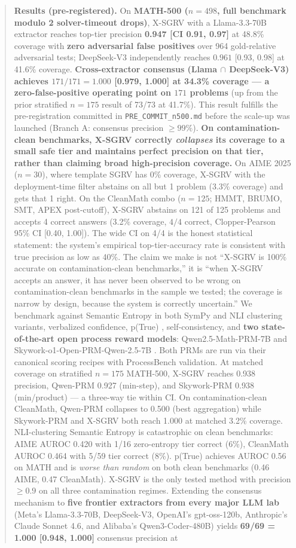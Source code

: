 \documentclass{article}
\begin{document}
\begin{abstract}
\textbf{Results (pre-registered).} On \textbf{MATH-500 ($n{=}498$, full benchmark modulo 2 solver-timeout drops)}, X-SGRV with a Llama-3.3-70B extractor reaches top-tier precision \textbf{0.947 [CI 0.91, 0.97]} at 48.8\% coverage with \textbf{zero adversarial false positives} over 964 gold-relative adversarial tests; DeepSeek-V3 independently reaches $0.961$ [0.93, 0.98] at 41.6\% coverage. \textbf{Cross-extractor consensus (Llama $\cap$ DeepSeek-V3) achieves $171/171 = 1.000$ [0.979, 1.000] at 34.3\% coverage --- a zero-false-positive operating point on $171$ problems} (up from the prior stratified $n{=}175$ result of 73/73 at 41.7\%). This result fulfills the pre-registration committed in \texttt{PRE\_COMMIT\_n500.md} before the scale-up was launched (Branch A: consensus precision $\ge 99\%$). \textbf{On contamination-clean benchmarks, X-SGRV correctly \emph{collapses} its coverage to a small safe tier and maintains perfect precision on that tier, rather than claiming broad high-precision coverage.} On AIME 2025 ($n{=}30$), where template SGRV has 0\% coverage, X-SGRV with the deployment-time filter abstains on all but 1 problem (3.3\% coverage) and gets that 1 right. On the CleanMath combo ($n{=}125$; HMMT, BRUMO, SMT, APEX post-cutoff), X-SGRV abstains on 121 of 125 problems and accepts 4 correct answers (3.2\% coverage, $4/4$ correct, Clopper-Pearson 95\% CI [0.40, 1.00]). The wide CI on 4/4 is the honest statistical statement: the system's empirical top-tier-accuracy rate is consistent with true precision as low as 40\%. The claim we make is not ``X-SGRV is 100\% accurate on contamination-clean benchmarks,'' it is ``when X-SGRV accepts an answer, it has never been observed to be wrong on contamination-clean benchmarks in the sample we tested; the coverage is narrow by design, because the system is correctly uncertain.'' We benchmark against Semantic Entropy \citep{kuhn2023semantic, farquhar2024nature} in both SymPy and NLI clustering variants, verbalized confidence, p(True) \citep{kadavath2022}, self-consistency, and \textbf{two state-of-the-art open process reward models}: Qwen2.5-Math-PRM-7B \citep{qwenprm2025} and Skywork-o1-Open-PRM-Qwen-2.5-7B \citep{skyworkprm2024}. Both PRMs are run via their canonical scoring recipes with ProcessBench validation. At matched coverage on stratified $n{=}175$ MATH-500, X-SGRV reaches 0.938 precision, Qwen-PRM 0.927 (min-step), and Skywork-PRM 0.938 (min/product) --- a three-way tie within CI. On contamination-clean CleanMath, Qwen-PRM collapses to 0.500 (best aggregation) while Skywork-PRM and X-SGRV both reach 1.000 at matched 3.2\% coverage. NLI-clustering Semantic Entropy is catastrophic on clean benchmarks: AIME AUROC 0.420 with 1/16 zero-entropy tier correct (6\%), CleanMath AUROC 0.464 with 5/59 tier correct (8\%). p(True) achieves AUROC 0.56 on MATH and is \emph{worse than random} on both clean benchmarks (0.46 AIME, 0.47 CleanMath). X-SGRV is the only tested method with precision $\ge 0.9$ on all three contamination regimes. Extending the consensus mechanism to \textbf{five frontier extractors from every major LLM lab} (Meta's Llama-3.3-70B, DeepSeek-V3, OpenAI's gpt-oss-120b, Anthropic's Claude Sonnet 4.6, and Alibaba's Qwen3-Coder-480B) yields \textbf{69/69 = 1.000 [0.948, 1.000]} consensus precision at 
\end{abstract}
\end{document}
